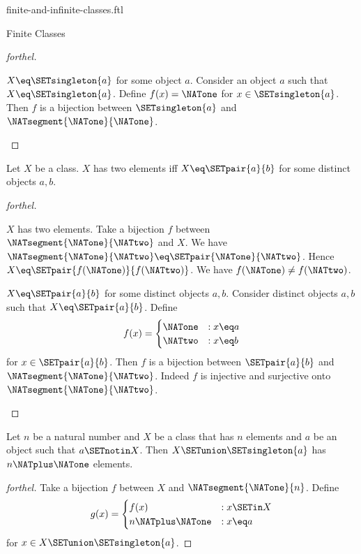 \documentclass{naproche-library}
\begin{document}
\begin{smodule}[title=Finite and Infinite Classes]{finite-and-infinite-classes.ftl}
\begin{sfragment}{Finite Classes}
\begin{proof}[forthel]
    \begin{case}{$X \eq \SETsingleton{a}$ for some object $a$.}
      Consider an object $a$ such that $X \eq \SETsingleton{a}$.
      Define $f(x) = \NATone$ for $x \in \SETsingleton{a}$.
      Then $f$ is a bijection between $\SETsingleton{a}$ and $\NATsegment{\NATone}{\NATone}$.
    \end{case}
  \end{proof}

  \begin{proposition}[forthel,id=FOUNDATIONS_14_3468912675458910]
    Let $X$ be a class.
    $X$ has two elements iff $X \eq \SETpair{a}{b}$ for some distinct objects $a, b$.
  \end{proposition}
  \begin{proof}[forthel]
    \begin{case}{$X$ has two elements.}
      Take a bijection $f$ between $\NATsegment{\NATone}{\NATtwo}$ and $X$.
      We have $\NATsegment{\NATone}{\NATtwo} \eq \SETpair{\NATone}{\NATtwo}$.
      Hence $X \eq \SETpair{f(\NATone)}{f(\NATtwo)}$.
      We have $f(\NATone) \neq f(\NATtwo)$.
    \end{case}

    \begin{case}{$X \eq \SETpair{a}{b}$ for some distinct objects $a, b$.}
      Consider distinct objects $a, b$ such that $X \eq \SETpair{a}{b}$.
      Define \[f(x) =
        \begin{cases}
          \NATone & : x \eq a \\
          \NATtwo & : x \eq b
        \end{cases}\]
      for $x \in \SETpair{a}{b}$.
      Then $f$ is a bijection between $\SETpair{a}{b}$ and $\NATsegment{\NATone}{\NATtwo}$.
      Indeed $f$ is injective and surjective onto $\NATsegment{\NATone}{\NATtwo}$.
    \end{case}
  \end{proof}

  \begin{proposition}[forthel,id=FOUNDATIONS_14_0615204230800975]
    Let $n$ be a natural number and $X$ be a class that has $n$ elements and $a$ be an object such that $a \SETnotin X$.
    Then $X \SETunion \SETsingleton{a}$ has $n \NATplus \NATone$ elements.
  \end{proposition}
  \begin{proof}[forthel]
    Take a bijection $f$ between $X$ and $\NATsegment{\NATone}{n}$.
    Define \[g(x) =
      \begin{cases}
        f(x)  & : x \SETin X \\
        n \NATplus \NATone & : x \eq a
      \end{cases}\]
    for $x \in X \SETunion \SETsingleton{a}$.


\end{proof}
\end{sfragment}
\end{smodule}
\end{document}
